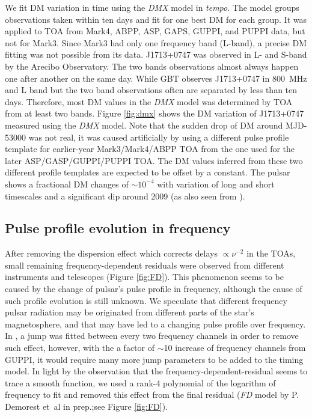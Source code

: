 We fit DM variation in time using the {\it DMX} model in {\it tempo}.
The model groups observations taken within ten days and fit for one
best DM for each group.   
It was applied to TOA from Mark4, ABPP, ASP, GAPS, GUPPI, and PUPPI data, but
not for Mark3. Since Mark3 had only one frequency band (L-band), a precise DM
fitting was not possible from its data.
J1713+0747 was observed in L- and S-band by the Arecibo Observatory. The
two bands observations almost always happen one after another on the same day.
While GBT observes J1713+0747 in 800~MHz and L band but the two band
observations often are separated by less than ten days.
Therefore, most DM values in the {\it DMX} model was determined by TOA from at
least two bands. Figure \ref{fig:dmx} shows the DM variation of J1713+0747 
measured using the {\it DMX} model.
Note that the sudden drop of DM around MJD-53000 was not real, it was caused
artificially by using a different pulse profile template for earlier-year Mark3/Mark4/ABPP TOA 
from the one used for the later
ASP/GASP/GUPPI/PUPPI TOA. The DM values inferred from these two different profile
templates are expected to be offset by a constant.
The pulsar shows a fractional DM changes of $\sim10^{-4}$ with variation of
long and short timescales and a significant dip around 2009 (as also seen from
\citealt{dfg+13}).



\subsection{Pulse profile evolution in frequency}
\label{sec:FD}
After removing the dispersion effect which corrects delays $\propto \nu^{-2}$
in the TOAs, small remaining frequency-dependent residuals were observed from
different instruments and telescopes (Figure \ref{fig:FD}).  
This phenomenon seems to be caused by the change of pulsar's pulse profile in
frequency, although the cause of such profile evolution is still unknown.
We speculate that different frequency pulsar radiation may be originated from
different parts of the star's magnetosphere, and that may have led to a
changing pulse profile over frequency.
In \citet{sns+05}, a jump was fitted between every two frequency channels in
order to remove such effect, however, with the a factor of $\sim$10 increase
of frequency channels from GUPPI, it would require many more jump parameters
to be added to the timing model.
In light by the observation that the frequency-dependent-residual seems to
trace a smooth function, we used a rank-4 polynomial of the logarithm of
frequency to fit and removed this effect from the final residual ({\it FD}
model by P. Demorest et~al in prep.;see Figure \ref{fig:FD}). 



